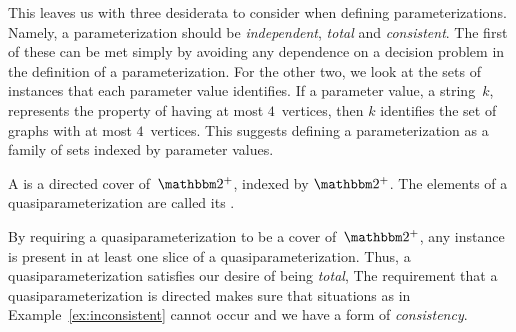 This leaves us with three desiderata to consider when defining parameterizations.
Namely, a parameterization should be \emph{independent}, \emph{total} and \emph{consistent}.
The first of these can be met simply by avoiding any dependence on a decision problem in the definition of a parameterization.
For the other two, we look at the sets of instances that each parameter value identifies.
If a parameter value, a string~$k$, represents the property of having at most $4$~vertices, then $k$ identifies the set of graphs with at most $4$~vertices.
This suggests defining a parameterization as a family of sets indexed by parameter values.
\begin{definition}
  A  is a directed cover of~$\binary^+$, indexed by $\binary^+$.
  The elements of a quasiparameterization are called its .
\end{definition}

By requiring a quasiparameterization to be a cover of~$\binary^+$, any instance is present in at least one slice of a quasiparameterization.
Thus, a quasiparameterization satisfies our desire of being \emph{total},
The requirement that a quasiparameterization is directed makes sure that situations as in Example~\ref{ex:inconsistent} cannot occur and we have a form of \emph{consistency}.

